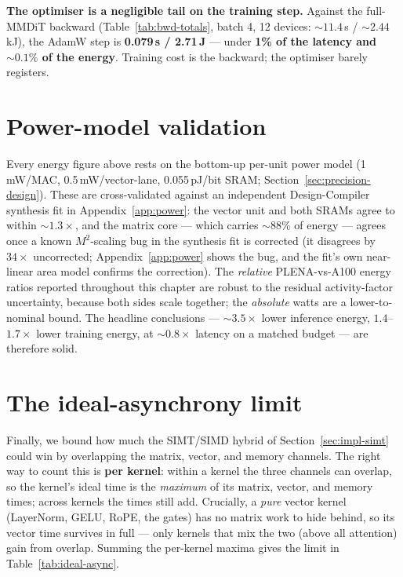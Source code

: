 \documentclass[11pt]{report}
\begin{document}
\textbf{The optimiser is a negligible tail on the training step.} Against
the full-MMDiT backward (Table~\ref{tab:bwd-totals}, batch 4, 12 devices:
${\sim}11.4$\,s / ${\sim}2.44$\,kJ), the AdamW step is \textbf{0.079\,s /
2.71\,J} --- under \textbf{1\% of the latency and ${\sim}0.1\%$ of the
energy}. Training cost is the backward; the optimiser barely registers.

\section{Power-model validation}
\label{sec:results-power}

Every energy figure above rests on the bottom-up per-unit power model
(1\,mW/MAC, 0.5\,mW/vector-lane, 0.055\,pJ/bit SRAM;
Section~\ref{sec:precision-design}). These are cross-validated against an
independent Design-Compiler synthesis fit in Appendix~\ref{app:power}: the
vector unit and both SRAMs agree to within ${\sim}1.3\times$, and the matrix
core --- which carries ${\sim}88\%$ of energy --- agrees once a known
$M^2$-scaling bug in the synthesis fit is corrected (it disagrees by
$34\times$ uncorrected; Appendix~\ref{app:power} shows the bug, and the fit's
own near-linear area model confirms the correction). The \emph{relative}
PLENA-vs-A100 energy ratios reported throughout this chapter are robust to
the residual activity-factor uncertainty, because both sides scale together;
the \emph{absolute} watts are a lower-to-nominal bound. The headline
conclusions --- ${\sim}3.5\times$ lower inference energy, $1.4$--$1.7\times$
lower training energy, at ${\sim}0.8\times$ latency on a matched budget ---
are therefore solid.

\section{The ideal-asynchrony limit}
\label{sec:results-ideal}

Finally, we bound how much the SIMT/SIMD hybrid of
Section~\ref{sec:impl-simt} could win by overlapping the matrix, vector, and
memory channels. The right way to count this is \textbf{per kernel}: within a
kernel the three channels can overlap, so the kernel's ideal time is the
\emph{maximum} of its matrix, vector, and memory times; across kernels the
times still add. Crucially, a \emph{pure} vector kernel (LayerNorm, GELU,
RoPE, the gates) has no matrix work to hide behind, so its vector time
survives in full --- only kernels that mix the two (above all attention) gain
from overlap. Summing the per-kernel maxima gives the limit in
Table~\ref{tab:ideal-async}.
\end{document}

